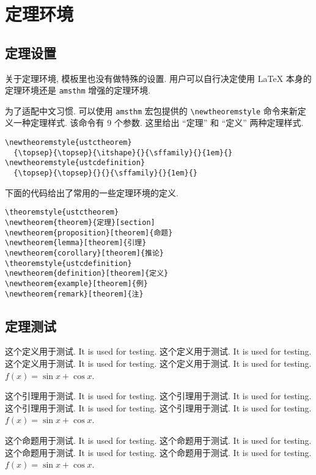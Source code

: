 \chapter{定理环境}

\section{定理设置}

关于定理环境, 模板里也没有做特殊的设置. 用户可以自行决定使用 \LaTeX{} 本身的定理环境还是 \verb|amsthm| 增强的定理环境.

为了适配中文习惯. 可以使用 \verb|amsthm| 宏包提供的 \verb|\newtheoremstyle| 命令来新定义一种定理样式. 该命令有 9 个参数. 这里给出 ``定理'' 和 ``定义'' 两种定理样式.
\begin{verbatim}
\newtheoremstyle{ustctheorem}
  {\topsep}{\topsep}{\itshape}{}{\sffamily}{}{1em}{}
\newtheoremstyle{ustcdefinition}
  {\topsep}{\topsep}{}{}{\sffamily}{}{1em}{}
\end{verbatim}

下面的代码给出了常用的一些定理环境的定义.
\begin{verbatim}
\theoremstyle{ustctheorem}
\newtheorem{theorem}{定理}[section]
\newtheorem{proposition}[theorem]{命题}
\newtheorem{lemma}[theorem]{引理}
\newtheorem{corollary}[theorem]{推论}
\theoremstyle{ustcdefinition}
\newtheorem{definition}[theorem]{定义}
\newtheorem{example}[theorem]{例}
\newtheorem{remark}[theorem]{注}
\end{verbatim}

\section{定理测试}

\begin{definition}[option]\label{def:test}
  这个定义用于测试. It is used for testing. 这个定义用于测试. It is used for testing. 这个定义用于测试. It is used for testing. 这个定义用于测试. It is used for testing. $f(x)=\sin x + \cos x$.
\end{definition}

\begin{lemma}\label{lem:test}
  这个引理用于测试. It is used for testing. 这个引理用于测试. It is used for testing. 这个引理用于测试. It is used for testing. 这个引理用于测试. It is used for testing. $f(x)=\sin x + \cos x$.
\end{lemma}

\begin{proposition}\label{prop:test}
  这个命题用于测试. It is used for testing. 这个命题用于测试. It is used for testing. 这个命题用于测试. It is used for testing. 这个命题用于测试. It is used for testing. $f(x)=\sin x + \cos x$.
\end{proposition}


